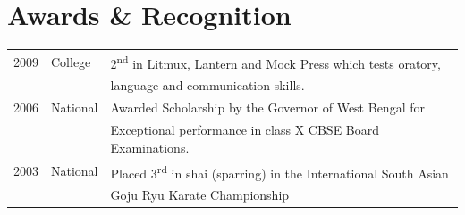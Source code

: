 \documentclass[letterpaper]{deedy-resume} %
\begin{document}
\begin{minipage}[t]{0.66\textwidth}
\sectionspace %

\section{Awards \& Recognition}

\begin{tabular}{rll}
2009 & College & 2\textsuperscript{nd} in Litmux, Lantern and Mock Press which tests oratory, \\
& & language and communication skills.\\
2006 & National & Awarded Scholarship by the Governor of West Bengal for\\
& & Exceptional performance in class X CBSE Board Examinations. \\
2003 & National & Placed 3\textsuperscript{rd} in shai (sparring) in the International South Asian \\
& & Goju Ryu Karate Championship\\
\end{tabular}

\sectionspace %


\end{minipage} %
\end{document}
